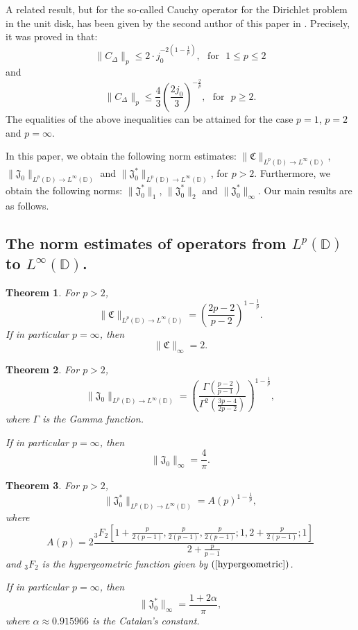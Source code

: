 \documentclass[a4paper,12pt]{amsart}
\newtheorem{thm}{Theorem}[section]
\theoremstyle{definition}
\numberwithin{equation}{section}
\newcommand{\ID}{{\mathbb D}}
\def\be{\begin{equation}}
\def\ee{\end{equation}}
\begin{document}
A related result, but for the so-called Cauchy operator for the Dirichlet problem in the unit disk, has been given by the second author of this paper in \cite{kalaj1,kalaj2}.
Precisely, it was proved in \cite[Theorem A]{kalaj1} that:
$$\|C_{\Delta}\|_{p}\leq 2\cdot j_0^{-2(1-\frac{1}{p})}, \ \ \ \mbox{for}\ \ \ 1\leq p\leq2$$
and
$$\|C_{\Delta}\|_{p}\leq \frac{4}{3}\left(\frac{2j_0}{3}\right)^{-\frac{2}{p}}, \ \ \ \mbox{for}\ \ \ p\geq 2.$$
The equalities of the above inequalities can be attained for the case $p=1$, $p=2$ and $p=\infty$.

In this paper, we obtain the following norm estimates: $\|\mathfrak{C}\|_{L^p(\ID)\rightarrow L^{\infty}(\ID)}$,
$\|\mathfrak{J}_0\|_{L^p(\ID)\rightarrow L^{\infty}(\ID)}$ and $\|\mathfrak{J}_0^*\|_{L^p(\ID)\rightarrow L^{\infty}(\ID)}$,  for $p>2$.
Furthermore, we obtain the following norms: $\|\mathfrak{J}_0^*\|_{1}$, $\|\mathfrak{J}_0^*\|_{2}$ and $\|\mathfrak{J}_0^*\|_{\infty}$. Our main results are as follows.


\subsection{The norm estimates of operators from $L^p(\ID)$ to $L^{\infty}(\ID)$.}

\begin{thm}\label{2019-May-26-thm}
For $p>2$,
\be\label{2019-May-20-1}
\|\mathfrak{C}\|_{L^p(\ID)\rightarrow L^{\infty}(\ID)}=\left(\frac{2p-2}{p-2}\right)^{1-\frac{1}{p}}.
\ee
If in particular $p=\infty$, then $$\|\mathfrak{C}\|_{\infty}=2.$$
\end{thm}

\begin{thm}\label{thm-Lp-BC*}
For $p>2$,
\be\label{2019-June-30-1}
\|\mathfrak{J}_0\|_{L^p{(\ID)}\rightarrow L^{\infty}(\ID)}=\left(\frac{\Gamma(\frac{p-2}{p-1})}{\Gamma^2\left(\frac{3p-4}{2p-2}\right)}\right)^{1-\frac{1}{p}},
\ee
where $\Gamma$ is the Gamma function.

If in particular $p=\infty$, then
\be\label{June-29-4}\|\mathfrak{J}_0\|_{\infty}=\frac{4}{\pi}.\ee
\end{thm}

\begin{thm}\label{2019-June-11-thm}
For $p>2$,
\be\label{2019-June-11-1}
\|\mathfrak{J}_0^*\|_{L^p{(\ID)}\rightarrow L^{\infty}(\ID)}= A(p)^{1-\frac{1}{p}},
\ee
where
$$A(p)=2\frac{{}_3F_2[1+\frac{p}{2(p-1)}, \frac{p}{2(p-1)},\frac{p}{2(p-1)}; 1, 2+\frac{p}{2(p-1)}; 1 ]}{2+\frac{p}{p-1}}$$
and ${}_3F_2$ is the hypergeometric function given by $(\ref{hypergeometric})$.

If in particular $p=\infty$, then
\be\label{June-29-1}\|\mathfrak{J}_0^*\|_{\infty}=\frac{1+2\alpha}{\pi},\ee
where $\alpha\approx 0.915966$ is the Catalan's constant.
\end{thm}
\end{document}
